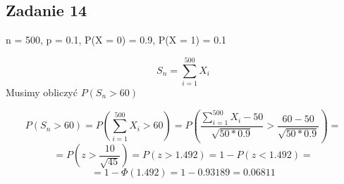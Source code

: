 \subsection{Zadanie 14}
n = 500, p = 0.1, P(X = 0) = 0.9, P(X = 1) = 0.1

$$S_n = \sum\limits_{i=1}^{500} X_i$$
Musimy obliczyć $ P(S_n > 60)$

$$P(S_n > 60) = P(\sum\limits_{i=1}^{500} X_i > 60) = P(\frac{\sum\limits_{i=1}^{500} X_i - 50}{\sqrt{50 * 0.9}} > \frac{60 - 50}{\sqrt{50 * 0.9}} ) =$$
$$ = P(z > \frac{10}{\sqrt{45}}) = P(z > 1.492) = 1 - P(z < 1.492) = $$
$$ = 1 - \Phi(1.492) = 1 - 0.93189 = 0.06811 $$
